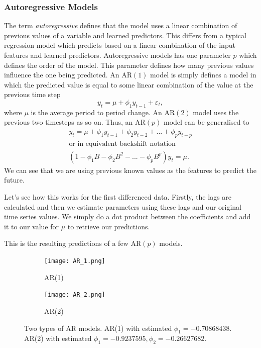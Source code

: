\documentclass{article}
\begin{document}
  \subsubsection{Autoregressive Models}
    The term \emph{autoregressive} defines that the model uses a linear combination of previous values of a variable and learned predictors. This differs from a typical regression model which predicts based on a linear combination of the input features and learned predictors.
    Autoregressive models has one parameter $p$ which defines the order of the model. This parameter defines how many previous values influence the one being predicted. 
    An AR$(1)$ model is simply defines a model in which the predicted value is equal to some linear combination of the value at the previous time step
    \begin{equation*}
      y_t = \mu + \phi_1 y_{t-1} + \varepsilon_t,
    \end{equation*}
    where $\mu$ is the average period to period change.
    An AR$(2)$ model uses the previous two timesteps as so on.
    Thus, an AR$(p)$ model can be generalised to
    \begin{gather*}
      y_t = \mu + \phi_1 y_{t-1} + \phi_2 y_{t-2} + ... + \phi_p y_{t-p}\\
      \text{or in equivalent backshift notation}\\
      (1 - \phi_1B - \phi_2B^2 - ... - \phi_pB^p)y_t = \mu.
    \end{gather*}
    We can see that we are using previous known values as the features to predict the future.

    Let's see how this works for the first differenced data. Firstly, the lags are calculated and then we estimate parameters using these lags and our original time series values. We simply do a dot product between the coefficients and add it to our value for $\mu$ to retrieve our predictions. 
    
    This is the resulting predictions of a few AR$(p)$ models.

    \begin{figure}[H]
      \centering
      \captionsetup{justification=centering}
      \begin{subfigure}[b]{0.49\linewidth}
        \texttt{[image: AR\_1.png]}
        \caption{AR(1)}
      \end{subfigure}
      \begin{subfigure}[b]{0.49\linewidth}
        \texttt{[image: AR\_2.png]}
        \caption{AR(2)}
      \end{subfigure}
      \caption{Two types of AR models. AR(1) with estimated $\phi_1 = -0.70868438$. AR(2) with estimated $\phi_1 = -0.9237595, \phi_2 =   -0.26627682$.}
    \end{figure}
\end{document}
